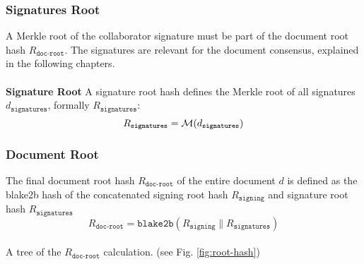  \subsubsection{Signatures Root}
 A Merkle root of the collaborator signature must be part of the document root hash $R_{\texttt{doc-root}}$. The signatures are relevant for the document consensus, explained in the following chapters. \\\\
\textbf{Signature Root} A signature root hash defines the Merkle root of all signatures $d_{\texttt{signatures}}$, formally $R_{\texttt{signatures}}$:
\newline
\begin{equation}
R_{\texttt{signatures}} = \mathcal{M}(d_{\texttt{signatures}})\\
\end{equation}
 \subsubsection{Document Root}
The final  document root hash $R_{\texttt{doc-root}}$ of the entire document $d$ is defined as the blake2b hash of the concatenated signing root hash $R_{\texttt{signing}}$ and signature root hash $R_{\texttt{signatures}}$ 
\newline
 \begin{equation}
R_{\texttt{doc-root}} =  \texttt{blake2b}(R_{\texttt{signing}}\|R_{\texttt{signatures}})
\end{equation}\\
A tree of the  $R_{\texttt{doc-root}}$ calculation. (see Fig. \ref{fig:root-hash})



